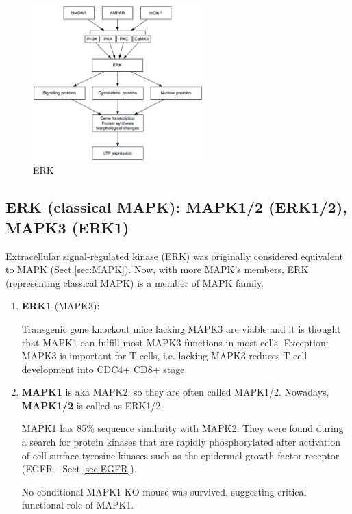 \begin{figure}[hbt]
  \centerline{\includegraphics[height=6cm,
    angle=0]{./images/ERK_convergence.eps}}
\caption{ERK }
\label{fig:ERK_convergence}
\end{figure}

\subsection{ERK (classical MAPK): MAPK1/2 (ERK1/2), MAPK3 (ERK1)}
\label{sec:ERK}
\label{sec:MAPK1/2}
\label{sec:MAPK3}

Extracellular signal-regulated kinase (ERK) was originally considered equivalent
to MAPK (Sect.\ref{sec:MAPK}). Now, with more MAPK's members, ERK (representing
classical MAPK) is a member of MAPK family.
\begin{enumerate}
  \item {\bf ERK1} (MAPK3): 
  
  Transgenic gene knockout mice lacking MAPK3 are viable and it is thought that
  MAPK1 can fulfill most MAPK3 functions in most cells. Exception: MAPK3
  is important for T cells, i.e. lacking MAPK3
  reduces T cell development into CDC4+ CD8+ stage.

  \item {\bf MAPK1} is aka MAPK2: so they are often called MAPK1/2.
  Nowadays, {\bf MAPK1/2} is called as ERK1/2.
  
  MAPK1 has 85\% sequence similarity with MAPK2.
  They were found during a search for protein kinases that are rapidly
  phosphorylated after activation of cell surface tyrosine kinases such as the
  epidermal growth factor receptor (EGFR - Sect.\ref{sec:EGFR}).
  
  No conditional MAPK1 KO mouse was survived, suggesting critical functional
  role of MAPK1. 
\end{enumerate}



